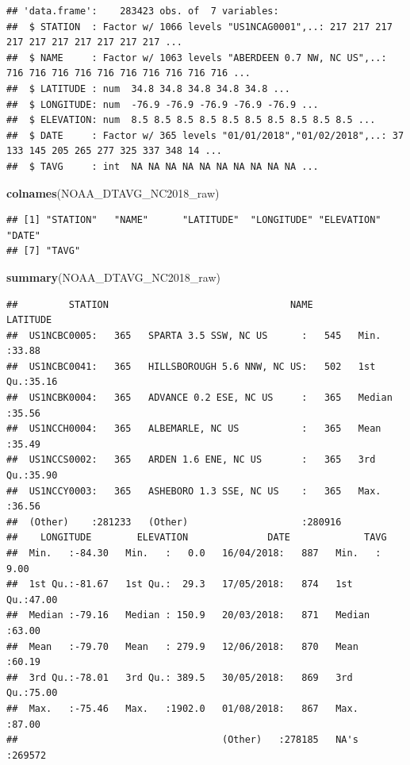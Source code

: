 \documentclass[12pt,]{article}
\newenvironment{Shaded}{\begin{snugshade}}{\end{snugshade}}
\newcommand{\KeywordTok}[1]{\textcolor[rgb]{0.13,0.29,0.53}{\textbf{#1}}}
\newcommand{\NormalTok}[1]{#1}
\begin{document}
\begin{verbatim}
## 'data.frame':    283423 obs. of  7 variables:
##  $ STATION  : Factor w/ 1066 levels "US1NCAG0001",..: 217 217 217 217 217 217 217 217 217 217 ...
##  $ NAME     : Factor w/ 1063 levels "ABERDEEN 0.7 NW, NC US",..: 716 716 716 716 716 716 716 716 716 716 ...
##  $ LATITUDE : num  34.8 34.8 34.8 34.8 34.8 ...
##  $ LONGITUDE: num  -76.9 -76.9 -76.9 -76.9 -76.9 ...
##  $ ELEVATION: num  8.5 8.5 8.5 8.5 8.5 8.5 8.5 8.5 8.5 8.5 ...
##  $ DATE     : Factor w/ 365 levels "01/01/2018","01/02/2018",..: 37 133 145 205 265 277 325 337 348 14 ...
##  $ TAVG     : int  NA NA NA NA NA NA NA NA NA NA ...
\end{verbatim}

\begin{Shaded}
\begin{Highlighting}[]
\KeywordTok{colnames}\NormalTok{(NOAA_DTAVG_NC2018_raw)}
\end{Highlighting}
\end{Shaded}

\begin{verbatim}
## [1] "STATION"   "NAME"      "LATITUDE"  "LONGITUDE" "ELEVATION" "DATE"     
## [7] "TAVG"
\end{verbatim}

\begin{Shaded}
\begin{Highlighting}[]
\KeywordTok{summary}\NormalTok{(NOAA_DTAVG_NC2018_raw)}
\end{Highlighting}
\end{Shaded}

\begin{verbatim}
##         STATION                                NAME           LATITUDE    
##  US1NCBC0005:   365   SPARTA 3.5 SSW, NC US      :   545   Min.   :33.88  
##  US1NCBC0041:   365   HILLSBOROUGH 5.6 NNW, NC US:   502   1st Qu.:35.16  
##  US1NCBK0004:   365   ADVANCE 0.2 ESE, NC US     :   365   Median :35.56  
##  US1NCCH0004:   365   ALBEMARLE, NC US           :   365   Mean   :35.49  
##  US1NCCS0002:   365   ARDEN 1.6 ENE, NC US       :   365   3rd Qu.:35.90  
##  US1NCCY0003:   365   ASHEBORO 1.3 SSE, NC US    :   365   Max.   :36.56  
##  (Other)    :281233   (Other)                    :280916                  
##    LONGITUDE        ELEVATION              DATE             TAVG       
##  Min.   :-84.30   Min.   :   0.0   16/04/2018:   887   Min.   : 9.00   
##  1st Qu.:-81.67   1st Qu.:  29.3   17/05/2018:   874   1st Qu.:47.00   
##  Median :-79.16   Median : 150.9   20/03/2018:   871   Median :63.00   
##  Mean   :-79.70   Mean   : 279.9   12/06/2018:   870   Mean   :60.19   
##  3rd Qu.:-78.01   3rd Qu.: 389.5   30/05/2018:   869   3rd Qu.:75.00   
##  Max.   :-75.46   Max.   :1902.0   01/08/2018:   867   Max.   :87.00   
##                                    (Other)   :278185   NA's   :269572
\end{verbatim}
\end{document}
